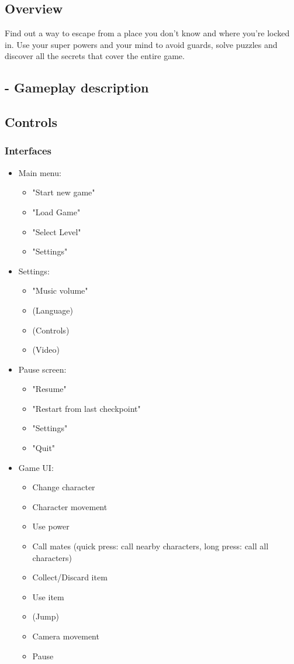 \subsection{Overview}
Find out a way to escape from a place you don’t know and where you’re locked in. Use your super powers and your mind to avoid guards, solve puzzles and discover all the secrets that cover the entire game.

\subsection{- Gameplay description}


\subsection{Controls}
\subsubsection{Interfaces}
\begin{itemize}  
\item Main menu: \begin{itemize}  
			\item "Start new game"
			\item "Load Game"
			\item "Select Level"
			\item "Settings"
			\end{itemize}
\item Settings:	\begin{itemize}  
			\item "Music volume"
			\item (Language)
			\item (Controls)
			\item (Video)
			\end{itemize}
\item Pause screen:	\begin{itemize}  
				\item "Resume"
				\item "Restart from last checkpoint"
				\item "Settings"
				\item "Quit"
				\end{itemize}
\item Game UI: \begin{itemize}  
			\item Change character
			\item Character movement
			\item Use power
			\item Call mates (quick press: call nearby characters, long press: call all characters)
			\item Collect/Discard item
			\item Use item
			\item (Jump)
			\item Camera movement
			\item Pause
			\end{itemize}
\end{itemize}

